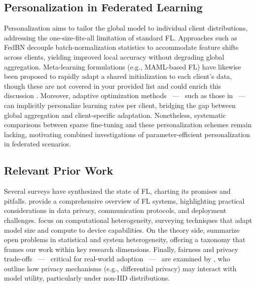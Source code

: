 \documentclass[10pt,twocolumn,letterpaper]{article}
\begin{document}
\subsection{Personalization in Federated Learning}
Personalization aims to tailor the global model to individual client distributions, addressing the one-size-fits-all limitation of standard FL. Approaches such as FedBN \cite{li2021fedbnfederatedlearningnoniid} decouple batch-normalization statistics to accommodate feature shifts across clients, yielding improved local accuracy without degrading global aggregation. Meta-learning formulations (e.g., MAML-based FL) have likewise been proposed to rapidly adapt a shared initialization to each client's data, though these are not covered in your provided list and could enrich this discussion \cite{fallah2020personalizedfederatedlearningmetalearning}. Moreover, adaptive optimization methods ~—~ such as those in \cite{reddi2021adaptivefederatedoptimization} ~—~ can implicitly personalize learning rates per client, bridging the gap between global aggregation and client-specific adaptation. Nonetheless, systematic comparisons between sparse fine-tuning and these personalization schemes remain lacking, motivating combined investigations of parameter-efficient personalization in federated scenarios.

\subsection{Relevant Prior Work}
Several surveys have synthesized the state of FL, charting its promises and pitfalls. \cite{Li_2023} provide a comprehensive overview of FL systems, highlighting practical considerations in data privacy, communication protocols, and deployment challenges. \cite{Pfeiffer_2023} focus on computational heterogeneity, surveying techniques that adapt model size and compute to device capabilities. On the theory side, \cite{kairouz2021advancesopenproblemsfederated} summarize open problems in statistical and system heterogeneity, offering a taxonomy that frames our work within key research dimensions. Finally, fairness and privacy trade-offs ~—~ critical for real-world adoption ~—~ are examined by \cite{chen2023privacyfairnessfederatedlearning}, who outline how privacy mechanisms (e.g., differential privacy) may interact with model utility, particularly under non-IID distributions.
\end{document}
